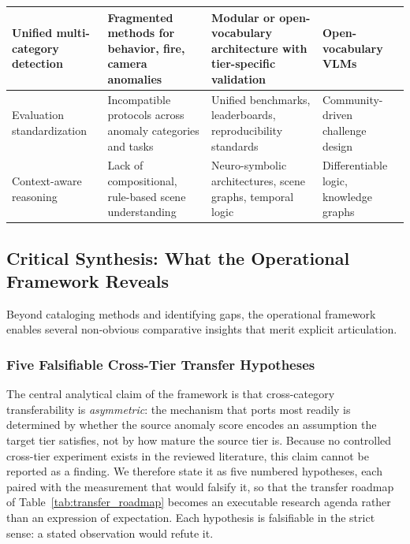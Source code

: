 \documentclass[10pt,a4paper]{article}
\begin{document}
\begin{table}[!t]
{\begin{tabular}{p{4.5cm}p{5.5cm}p{4.0cm}p{3.5cm}}
\midrule
Unified multi-category detection & Fragmented methods for behavior, fire, camera anomalies & Modular or open-vocabulary architecture with tier-specific validation & Open-vocabulary VLMs \\
\midrule
Evaluation standardization & Incompatible protocols across anomaly categories and tasks & Unified benchmarks, leaderboards, reproducibility standards & Community-driven challenge design \\
\midrule
Context-aware reasoning & Lack of compositional, rule-based scene understanding & Neuro-symbolic architectures, scene graphs, temporal logic & Differentiable logic, knowledge graphs \\
\bottomrule
\end{tabular}%
}
\end{table}


\subsection{Critical Synthesis: What the Operational Framework Reveals}
\label{subsec:critical_synthesis}

Beyond cataloging methods and identifying gaps, the operational framework enables several non-obvious comparative insights that merit explicit articulation.

\subsubsection{Five Falsifiable Cross-Tier Transfer Hypotheses}
\label{subsubsec:hypotheses}

The central analytical claim of the framework is that cross-category transferability is \emph{asymmetric}: the mechanism that ports most readily is determined by whether the source anomaly score encodes an assumption the target tier satisfies, not by how mature the source tier is. Because no controlled cross-tier experiment exists in the reviewed literature, this claim cannot be reported as a finding. We therefore state it as five numbered hypotheses, each paired with the measurement that would falsify it, so that the transfer roadmap of Table~\ref{tab:transfer_roadmap} becomes an executable research agenda rather than an expression of expectation. Each hypothesis is falsifiable in the strict sense: a stated observation would refute it.
\end{document}
